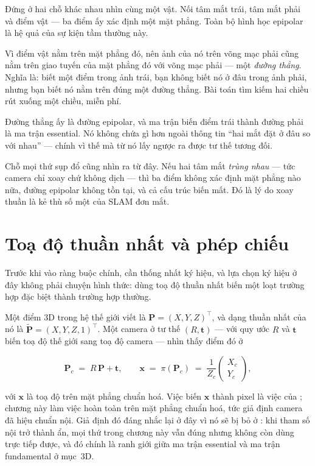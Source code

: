 \documentclass[../../vslam.tex]{subfiles}
\begin{document}
\begin{trucgiac}
Đứng ở hai chỗ khác nhau nhìn cùng một vật. Nối tâm mắt trái, tâm mắt phải và điểm vật --- ba điểm ấy xác định một mặt phẳng. Toàn bộ hình học epipolar là hệ quả của sự kiện tầm thường này.

Vì điểm vật nằm trên mặt phẳng đó, nên ảnh của nó trên võng mạc phải cũng nằm trên giao tuyến của mặt phẳng đó với võng mạc phải --- một \emph{đường thẳng}. Nghĩa là: biết một điểm trong ảnh trái, bạn không biết nó ở đâu trong ảnh phải, nhưng bạn biết nó nằm trên đúng một đường thẳng. Bài toán tìm kiếm hai chiều rút xuống một chiều, miễn phí.

Đường thẳng ấy là đường epipolar, và ma trận biến điểm trái thành đường phải là ma trận essential. Nó không chứa gì hơn ngoài thông tin ``hai mắt đặt ở đâu so với nhau'' --- chính vì thế mà từ nó lấy ngược ra được tư thế tương đối.

Chỗ mọi thứ sụp đổ cũng nhìn ra từ đây. Nếu hai tâm mắt \emph{trùng nhau} --- tức camera chỉ xoay chứ không dịch --- thì ba điểm không xác định mặt phẳng nào nữa, đường epipolar không tồn tại, và cả cấu trúc biến mất. Đó là lý do xoay thuần là kẻ thù số một của SLAM đơn mắt.
\end{trucgiac}

\section{Toạ độ thuần nhất và phép chiếu}

Trước khi vào ràng buộc chính, cần thống nhất ký hiệu, và lựa chọn ký hiệu ở đây không phải chuyện hình thức: dùng toạ độ thuần nhất biến một loạt trường hợp đặc biệt thành trường hợp thường.

Một điểm \(3\)D trong hệ thế giới viết là \(\mathbf{P} = (X, Y, Z)^{\top}\), và dạng thuần nhất của nó là \(\tilde{\mathbf{P}} = (X,Y,Z,1)^{\top}\). Một camera ở tư thế \((R, \mathbf{t})\) --- với quy ước \(R\) và \(\mathbf{t}\) biến toạ độ thế giới sang toạ độ camera --- nhìn thấy điểm đó ở

\[
\mathbf{P}_c \;=\; R\,\mathbf{P} + \mathbf{t},
\qquad
\mathbf{x} \;=\; \pi(\mathbf{P}_c) \;=\; \frac{1}{Z_c}\begin{pmatrix} X_c \\ Y_c \end{pmatrix},
\]

với \(\mathbf{x}\) là toạ độ trên mặt phẳng chuẩn hoá. Việc biến \(\mathbf{x}\) thành pixel là việc của ; chương này làm việc hoàn toàn trên mặt phẳng chuẩn hoá, tức giả định camera đã hiệu chuẩn nội. Giả định đó đáng nhắc lại ở đây vì nó sẽ bị bỏ ở : khi tham số nội trở thành ẩn, mọi thứ trong chương này vẫn đúng nhưng không còn dùng trực tiếp được, và đó chính là ranh giới giữa ma trận essential và ma trận fundamental ở mục~3D.
\end{document}
